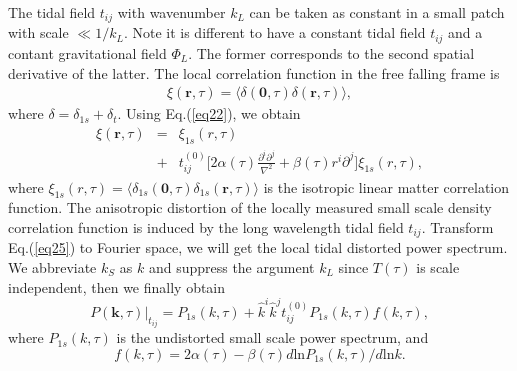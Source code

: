 \documentclass[aps,prd,twocolumn,showpacs,superscriptaddress,groupedaddress,nofootinbib]{revtex4}  %
\newcommand{\mr}{\mathrm}
\begin{document}
The tidal field $t_{ij}$ with wavenumber $k_L$ can be taken as constant in a 
small patch with scale $\ll1/k_L$. Note it is different to 
have a constant tidal field $t_{ij}$ and a contant gravitational field $\Phi_L$.
The former corresponds to the second spatial derivative of the latter.
The local correlation function in the free falling frame is 
\begin{eqnarray}
\xi(\bm{r},\tau)=\langle\delta(\bm{0},\tau)\delta(\bm{r},\tau)\rangle,
\end{eqnarray}
where $\delta=\delta_{1s}+\delta_{t}$. Using Eq.(\ref{eq22}), we obtain
\begin{eqnarray}
\label{eq25}
\xi(\bm{r},\tau)&=&\xi_{1s}(r,\tau)\nonumber\\
&+&t_{ij}^{(0)}\bigg[2\alpha(\tau)\frac{\partial^i\partial^j}{\nabla^2}+
\beta(\tau)r^i\partial^j\bigg]\xi_{1s}(r,\tau),
\end{eqnarray}
where $\xi_{1s}(r,\tau)=\langle\delta_{1s}(\bm{0},\tau)
\delta_{1s}(\bm{r},\tau)\rangle$ is the isotropic linear matter correlation
function. 
The anisotropic distortion of the locally measured small scale density 
correlation function is induced by the long wavelength tidal field $t_{ij}$.
Transform Eq.(\ref{eq25}) to Fourier space, we will get the local tidal distorted
power spectrum. We abbreviate $k_S$ as $k$ and suppress the 
argument $k_L$ since $T(\tau)$ is scale independent, then we finally obtain
\begin{equation}
\label{eq26}
P(\bm{k},\tau)|_{t_{ij}}=P_{1s}(k,\tau)+
\hat{k}^i\hat{k}^jt_{ij}^{(0)}P_{1s}(k,\tau)f(k,\tau),
\end{equation}
where $P_{1s}(k,\tau)$ is the undistorted small scale power spectrum, and
\begin{equation}
f(k,\tau)=2\alpha(\tau)-\beta(\tau){d\mr{ln}P_{1s}(k,\tau)}/{d\mr{ln}k}.
\end{equation}
\end{document}
